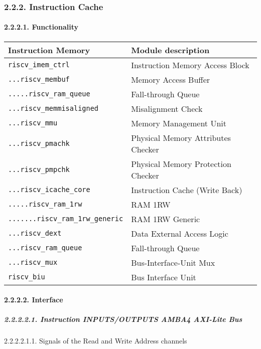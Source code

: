 \documentclass[]{article}
\let\oldparagraph\paragraph
\renewcommand{\paragraph}[1]{\oldparagraph{#1}\mbox{}}
\let\oldsubparagraph\subparagraph
\renewcommand{\subparagraph}[1]{\oldsubparagraph{#1}\mbox{}}
\begin{document}
\subsubsection{2.2.2. Instruction Cache}\label{instruction-cache}

\paragraph{2.2.2.1. Functionality}\label{functionality-1}

\begin{longtable}[]{@{}ll@{}}
\toprule
Instruction Memory & Module description\tabularnewline
\midrule
\endhead
\texttt{riscv\_imem\_ctrl} & Instruction Memory Access
Block\tabularnewline
\texttt{...riscv\_membuf} & Memory Access Buffer\tabularnewline
\texttt{.....riscv\_ram\_queue} & Fall-through Queue\tabularnewline
\texttt{...riscv\_memmisaligned} & Misalignment Check\tabularnewline
\texttt{...riscv\_mmu} & Memory Management Unit\tabularnewline
\texttt{...riscv\_pmachk} & Physical Memory Attributes
Checker\tabularnewline
\texttt{...riscv\_pmpchk} & Physical Memory Protection
Checker\tabularnewline
\texttt{...riscv\_icache\_core} & Instruction Cache (Write
Back)\tabularnewline
\texttt{.....riscv\_ram\_1rw} & RAM 1RW\tabularnewline
\texttt{.......riscv\_ram\_1rw\_generic} & RAM 1RW
Generic\tabularnewline
\texttt{...riscv\_dext} & Data External Access Logic\tabularnewline
\texttt{...riscv\_ram\_queue} & Fall-through Queue\tabularnewline
\texttt{...riscv\_mux} & Bus-Interface-Unit Mux\tabularnewline
\texttt{riscv\_biu} & Bus Interface Unit\tabularnewline
\bottomrule
\end{longtable}

\paragraph{2.2.2.2. Interface}\label{interface-1}

\subparagraph{2.2.2.2.1. Instruction INPUTS/OUTPUTS AMBA4 AXI-Lite
Bus}\label{instruction-inputsoutputs-amba4-axi-lite-bus}

2.2.2.2.1.1. Signals of the Read and Write Address channels
\end{document}
